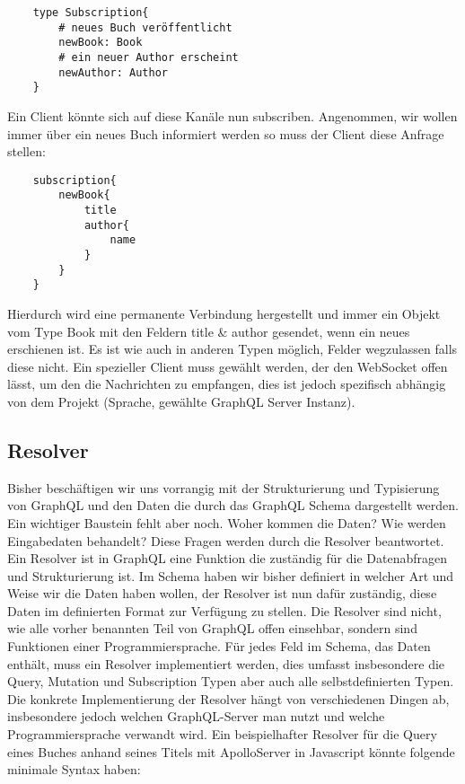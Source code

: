 \begin{verbatim}
    type Subscription{
        # neues Buch veröffentlicht
        newBook: Book
        # ein neuer Author erscheint
        newAuthor: Author
    }
\end{verbatim}

Ein Client könnte sich auf diese Kanäle nun subscriben.
Angenommen, wir wollen immer über ein neues Buch informiert werden so muss der Client diese Anfrage stellen:

\begin{verbatim}
    subscription{
        newBook{
            title
            author{
                name
            }
        }
    }
\end{verbatim}

Hierdurch wird eine permanente Verbindung hergestellt und immer ein Objekt vom Type Book mit den Feldern title \& author gesendet, wenn ein neues erschienen ist.
Es ist wie auch in anderen Typen möglich, Felder wegzulassen falls diese nicht.
Ein spezieller Client muss gewählt werden, der den WebSocket offen lässt, um den die Nachrichten zu empfangen, dies ist
jedoch spezifisch abhängig von dem Projekt (Sprache, gewählte GraphQL Server Instanz).

\subsection{Resolver}

Bisher beschäftigen wir uns vorrangig mit der Strukturierung und Typisierung von GraphQL und den Daten die durch
das GraphQL Schema dargestellt werden.
Ein wichtiger Baustein fehlt aber noch.
Woher kommen die Daten?
Wie werden Eingabedaten behandelt?
Diese Fragen werden durch die Resolver beantwortet.
Ein Resolver ist in GraphQL eine Funktion die zuständig für die Datenabfragen und Strukturierung ist.
Im Schema haben wir bisher definiert in welcher Art und Weise wir die Daten haben wollen, der Resolver ist nun dafür zuständig,
diese Daten im definierten Format zur Verfügung zu stellen.
Die Resolver sind nicht, wie alle vorher benannten Teil von GraphQL offen einsehbar, sondern sind Funktionen einer Programmiersprache.
Für jedes Feld im Schema, das Daten enthält, muss ein Resolver implementiert werden, dies umfasst insbesondere die Query, Mutation und Subscription Typen aber auch
alle selbstdefinierten Typen.
Die konkrete Implementierung der Resolver hängt von verschiedenen Dingen ab, insbesondere jedoch welchen GraphQL-Server man nutzt und welche Programmiersprache verwandt wird.
Ein beispielhafter Resolver für die Query eines Buches anhand seines Titels mit ApolloServer in Javascript könnte folgende minimale Syntax haben:

